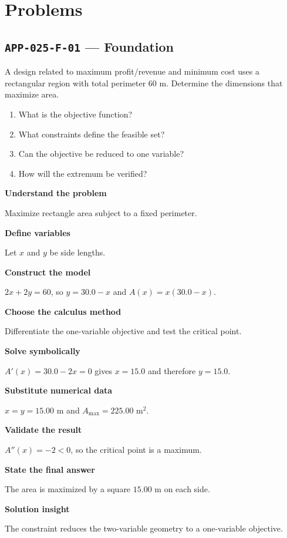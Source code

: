 \documentclass[11pt]{book}
\newcommand{\pid}[1]{\texttt{#1}}
\begin{document}
\section*{Problems}
\subsection*{\pid{APP-025-F-01} — Foundation}
\begin{problembox}
A design related to maximum profit/revenue and minimum cost uses a rectangular region with total perimeter 60 m. Determine the dimensions that maximize area.
\end{problembox}
\begin{promptbox}\begin{enumerate}
\item What is the objective function?
\item What constraints define the feasible set?
\item Can the objective be reduced to one variable?
\item How will the extremum be verified?
\end{enumerate}\end{promptbox}
\begin{solutionbox}
\textbf{Understand the problem}\par Maximize rectangle area subject to a fixed perimeter.\par\medskip
\textbf{Define variables}\par Let $x$ and $y$ be side lengths.\par\medskip
\textbf{Construct the model}\par $2x+2y=60$, so $y=30.0-x$ and $A(x)=x(30.0-x)$.\par\medskip
\textbf{Choose the calculus method}\par Differentiate the one-variable objective and test the critical point.\par\medskip
\textbf{Solve symbolically}\par $A'(x)=30.0-2x=0$ gives $x=15.0$ and therefore $y=15.0$.\par\medskip
\textbf{Substitute numerical data}\par $x=y=15.00$ m and $A_{\max}=225.00$ m$^2$.\par\medskip
\textbf{Validate the result}\par $A''(x)=-2<0$, so the critical point is a maximum.\par\medskip
\textbf{State the final answer}\par The area is maximized by a square $15.00$ m on each side.\par\medskip
\textbf{Solution insight}\par The constraint reduces the two-variable geometry to a one-variable objective.\par\medskip
\end{solutionbox}
\end{document}
